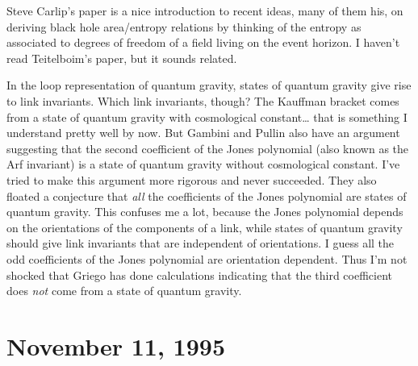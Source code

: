 \documentclass{article}
\renewcommand{\texttt}[1]{%
  \begingroup
  \ttfamily
  \begingroup\lccode`~=`/\lowercase{\endgroup\def~}{/\discretionary{}{}{}}%
  \begingroup\lccode`~=`[\lowercase{\endgroup\def~}{[\discretionary{}{}{}}%
  \begingroup\lccode`~=`.\lowercase{\endgroup\def~}{.\discretionary{}{}{}}%
  \catcode`/=\active\catcode`[=\active\catcode`.=\active
  \scantokens{#1\noexpand}%
  \endgroup
}
\begin{document}
Steve Carlip's paper is a nice introduction to recent ideas, many of
them his, on deriving black hole area/entropy relations by thinking of
the entropy as associated to degrees of freedom of a field living on the
event horizon. I haven't read Teitelboim's paper, but it sounds related.


In the loop representation of quantum gravity, states of quantum gravity
give rise to link invariants. Which link invariants, though? The
Kauffman bracket comes from a state of quantum gravity with cosmological
constant\ldots{} that is something I understand pretty well by now. But
Gambini and Pullin also have an argument suggesting that the second
coefficient of the Jones polynomial (also known as the Arf invariant) is
a state of quantum gravity without cosmological constant. I've tried to
make this argument more rigorous and never succeeded. They also floated
a conjecture that \emph{all} the coefficients of the Jones polynomial
are states of quantum gravity. This confuses me a lot, because the Jones
polynomial depends on the orientations of the components of a link,
while states of quantum gravity should give link invariants that are
independent of orientations. I guess all the odd coefficients of the
Jones polynomial are orientation dependent. Thus I'm not shocked that
Griego has done calculations indicating that the third coefficient does
\emph{not} come from a state of quantum gravity.



\hypertarget{week69}{%
\section{November 11, 1995}\label{week69}}
\end{document}
